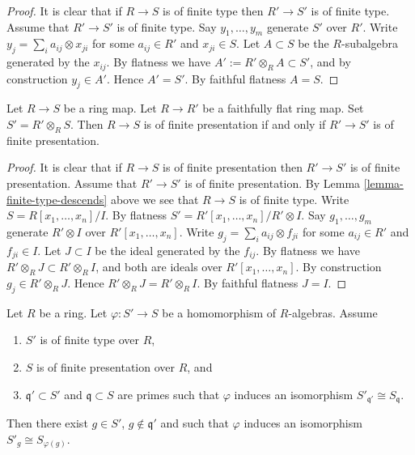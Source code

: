 \begin{proof}
It is clear that if $R \to S$ is of finite type then $R' \to S'$
is of finite type. Assume that $R' \to S'$ is of finite type.
Say $y_1, \ldots, y_m$ generate $S'$ over $R'$.
Write $y_j = \sum_i a_{ij} \otimes x_{ji}$ for some
$a_{ij} \in R'$ and $x_{ji} \in S$. Let $A \subset S$
be the $R$-subalgebra generated by the $x_{ij}$.
By flatness we have $A' := R' \otimes_R A \subset S'$, and
by construction $y_j \in A'$. Hence $A' = S'$.
By faithful flatness $A = S$.
\end{proof}

\begin{lemma}
\label{lemma-finite-presentation-descends}
Let $R \to S$ be a ring map.
Let $R \to R'$ be a faithfully flat ring map.
Set $S' = R'\otimes_R S$.
Then $R \to S$ is of finite presentation if and only if $R' \to S'$
is of finite presentation.
\end{lemma}

\begin{proof}
It is clear that if $R \to S$ is of finite presentation then $R' \to S'$
is of finite presentation. Assume that $R' \to S'$ is of finite presentation.
By Lemma \ref{lemma-finite-type-descends} above we see
that $R \to S$ is of finite type. Write $S = R[x_1, \ldots, x_n]/I$.
By flatness $S' = R'[x_1, \ldots, x_n]/R'\otimes I$.
Say $g_1, \ldots, g_m$ generate $R'\otimes I$ over $R'[x_1, \ldots, x_n]$.
Write $g_j = \sum_i a_{ij} \otimes f_{ji}$ for some
$a_{ij} \in R'$ and $f_{ji} \in I$. Let $J \subset I$
be the ideal generated by the $f_{ij}$.
By flatness we have $R' \otimes_R J \subset R'\otimes_R I$, and
both are ideals over $R'[x_1, \ldots, x_n]$.
By construction $g_j \in R' \otimes_R J$. Hence
$R' \otimes_R J = R'\otimes_R I$.
By faithful flatness $J = I$.
\end{proof}


\begin{lemma}
\label{lemma-local-isomorphism}
Let $R$ be a ring. Let $\varphi : S' \to S$ be a homomorphism of
$R$-algebras. Assume
\begin{enumerate}
\item $S'$ is of finite type over $R$,
\item $S$ is of finite presentation over $R$, and
\item $\mathfrak q' \subset S'$ and $\mathfrak q \subset S$
are primes such that $\varphi$ induces an
isomorphism $S'_{\mathfrak q'} \cong S_{\mathfrak q}$.
\end{enumerate}
Then there exist $g \in S'$, $g \not \in \mathfrak q'$ and
such that $\varphi$ induces an isomorphism
$S'_{g} \cong S_{\varphi(g)}$.
\end{lemma}

